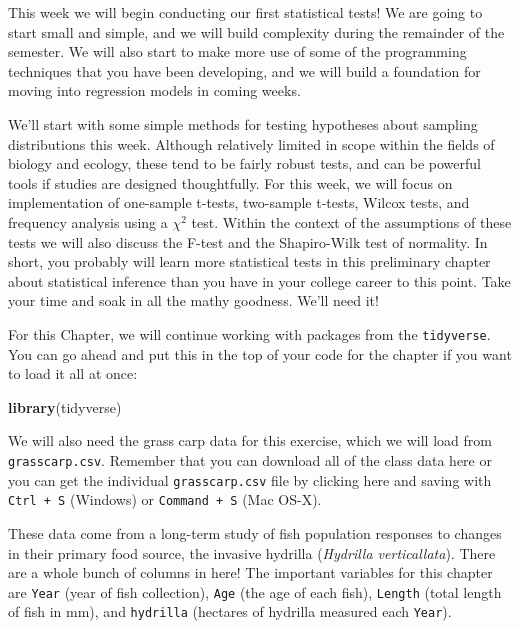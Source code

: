 \documentclass[
]{book}
\newenvironment{Shaded}{\begin{snugshade}}{\end{snugshade}}
\newcommand{\KeywordTok}[1]{\textcolor[rgb]{0.13,0.29,0.53}{\textbf{#1}}}
\newcommand{\NormalTok}[1]{#1}
\begin{document}
This week we will begin conducting our first statistical tests! We are going to start small and simple, and we will build complexity during the remainder of the semester. We will also start to make more use of some of the programming techniques that you have been developing, and we will build a foundation for moving into regression models in coming weeks.

We'll start with some simple methods for testing hypotheses about sampling distributions this week. Although relatively limited in scope within the fields of biology and ecology, these tend to be fairly robust tests, and can be powerful tools if studies are designed thoughtfully. For this week, we will focus on implementation of one-sample t-tests, two-sample t-tests, Wilcox tests, and frequency analysis using a \(\chi^2\) test. Within the context of the assumptions of these tests we will also discuss the F-test and the Shapiro-Wilk test of normality. In short, you probably will learn more statistical tests in this preliminary chapter about statistical inference than you have in your college career to this point. Take your time and soak in all the mathy goodness. We'll need it!

For this Chapter, we will continue working with packages from the \texttt{tidyverse}. You can go ahead and put this in the top of your code for the chapter if you want to load it all at once:

\begin{Shaded}
\begin{Highlighting}[]
\KeywordTok{library}\NormalTok{(tidyverse)}
\end{Highlighting}
\end{Shaded}

We will also need the grass carp data for this exercise, which we will load from \texttt{grasscarp.csv}. Remember that you can download all of the class data here or you can get the individual \texttt{grasscarp.csv} file by clicking here and saving with \texttt{Ctrl\ +\ S} (Windows) or \texttt{Command\ +\ S} (Mac OS-X).

These data come from a long-term study of fish population responses to changes in their primary food source, the invasive hydrilla (\emph{Hydrilla verticallata}). There are a whole bunch of columns in here! The important variables for this chapter are \texttt{Year} (year of fish collection), \texttt{Age} (the age of each fish), \texttt{Length} (total length of fish in mm), and \texttt{hydrilla} (hectares of hydrilla measured each \texttt{Year}).
\end{document}

